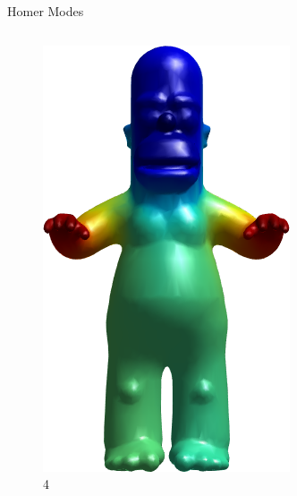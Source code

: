 \documentclass{beamer}
\begin{document}
\begin{frame}{Homer Modes}
\begin{columns}
\begin{column}[T]{3cm}
\begin{figure}[t]
    \includegraphics[width=\textwidth]{Harmonics/HomerModes/4.png}
    \caption*{\huge 4}
\end{figure}
\end{column}
\begin{column}[T]{3cm}
\begin{figure}[t]


\end{figure}
\end{column}
\end{columns}
\end{frame}
\end{document}
